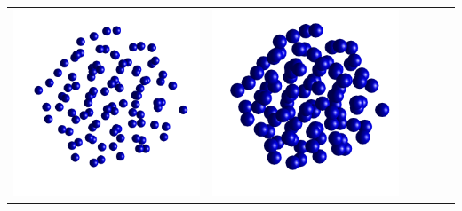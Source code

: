 \begin{teaserfigure}
\begin{tabular}{cccccc}
        \includegraphics[height=\resLen]{images/particle/300nm_N100.png} &
        \includegraphics[height=\resLen]{images/particle/500nm_N100.png} &

\end{tabular}
\end{teaserfigure}
